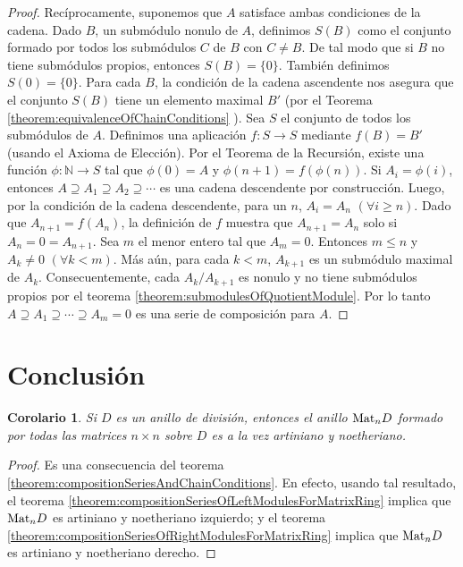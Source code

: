 \documentclass{report}
\newcommand{\naturalNumbers}{\mathbb{N}}
\newcommand{\Mat}{\textnormal{Mat}}
\newtheorem{corollary}{Corolario}
\begin{document}
\begin{proof}
    Recíprocamente, suponemos que \(A\) satisface ambas condiciones de la cadena.
    Dado \(B\), un submódulo nonulo de \(A\), definimos \(S(B)\) como el conjunto formado por todos los submódulos \(C\) de \(B\) con \(C \neq B\).
    De tal modo que si \(B\) no tiene submódulos propios, entonces \(S(B) = \{0\}\).
    También definimos \(S(0) = \{0\}\).
    Para cada \(B\), la condición de la cadena ascendente nos asegura que el conjunto \(S(B)\) tiene un elemento maximal \(B'\) (por el Teorema \ref{theorem:equivalenceOfChainConditions}
    ).
    Sea \(S\) el conjunto de todos los submódulos de \(A\).
    Definimos una aplicación \(f : S \rightarrow S\) mediante \(f(B) = B'\) (usando el Axioma de Elección).
    Por el Teorema de la Recursión, existe una función \(\phi : \naturalNumbers \rightarrow S\) tal que \(\phi(0) = A\) y \(\phi(n + 1) = f(\phi(n))\).
    Si \(A_i = \phi(i)\), entonces \(A \supseteq A_1 \supseteq A_2 \supseteq \cdots\) es una cadena descendente por construcción.
    Luego, por la condición de la cadena descendente, para un \(n\), \(A_i = A_n\) \((\forall i \geq n)\).
    Dado que \(A_{n + 1} = f(A_n)\), la definición de \(f\) muestra que \(A_{n + 1} = A_n\) solo si \(A_n = 0 = A_{n + 1}\).
    Sea \(m\) el menor entero tal que \(A_m = 0\).
    Entonces \(m \leq n\) y \(A_k \neq 0\) \((\forall k < m)\).
    Más aún, para cada \(k < m\), \(A_{k + 1}\) es un submódulo maximal de \(A_k\).
    Consecuentemente, cada \(A_k / A_{k + 1}\) es nonulo y no tiene submódulos propios por el teorema \ref{theorem:submodulesOfQuotientModule}.
    Por lo tanto \(A \supseteq A_1 \supseteq \cdots \supseteq A_m = 0\) es una serie de composición para \(A\).
  \end{proof}

  \section{Conclusión}

  \begin{corollary}
    \label{corollary:matrixRingIsArtinianAndNoetherian}
    Si \(D\) es un anillo de división, entonces el anillo \(\Mat_n D\) formado por todas las matrices \(n \times n\) sobre \(D\) es a la vez artiniano y noetheriano.
  \end{corollary}
  \begin{proof}
    Es una consecuencia del teorema \ref{theorem:compositionSeriesAndChainConditions}.
    En efecto, usando tal resultado, el teorema \ref{theorem:compositionSeriesOfLeftModulesForMatrixRing} implica que \(\Mat_n D\) es artiniano y noetheriano izquierdo; y el teorema \ref{theorem:compositionSeriesOfRightModulesForMatrixRing} implica que \(\Mat_n D\) es artiniano y noetheriano derecho.
  \end{proof}
\end{document}
